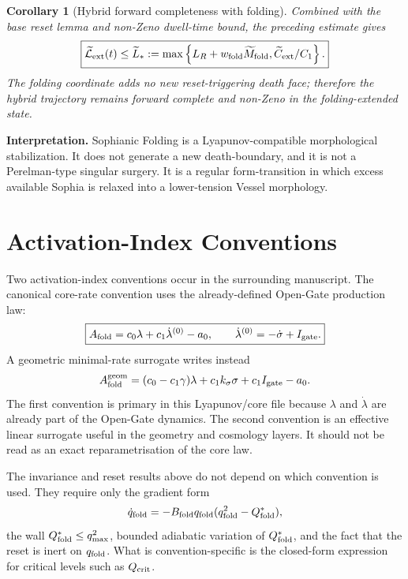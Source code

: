 \documentclass[11pt,a4paper]{article}
\theoremstyle{plain}
\newtheorem{corollary}{Corollary}
\theoremstyle{definition}
\theoremstyle{remark}
\begin{document}
\begin{corollary}[Hybrid forward completeness with folding]
Combined with the base reset lemma and non-Zeno dwell-time bound, the preceding
estimate gives
\begin{equation}
  \boxed{
  \widetilde{\mathcal L}_{\rm ext}(t)
  \le
  \widetilde L_*:=
  \max\left\{L_R+w_{\rm fold}\widetilde M_{\rm fold},
  \widetilde C_{\rm ext}/C_1\right\}.}
\end{equation}
The folding coordinate adds no new reset-triggering death face; therefore the
hybrid trajectory remains forward complete and non-Zeno in the folding-extended
state.
\end{corollary}

\textbf{Interpretation.} Sophianic Folding is a Lyapunov-compatible
morphological stabilization. It does not generate a new death-boundary, and it
is not a Perelman-type singular surgery. It is a regular form-transition in
which excess available Sophia is relaxed into a lower-tension Vessel morphology.



\section{Activation-Index Conventions}

Two activation-index conventions occur in the surrounding manuscript. The
canonical core-rate convention uses the already-defined Open-Gate production
law:
\begin{equation}
  \boxed{
  A_{\rm fold}=c_0\lambda+c_1\dot\lambda^{(0)}-a_0,
  \qquad
  \dot\lambda^{(0)}=-\dot\sigma+I_{\rm gate}.}
\end{equation}
A geometric minimal-rate surrogate writes instead
\begin{equation}
  A_{\rm fold}^{\rm geom}
  =(c_0-c_1\gamma)\lambda+c_1k_\sigma\sigma+c_1I_{\rm gate}-a_0.
\end{equation}
The first convention is primary in this Lyapunov/core file because $\lambda$ and
$\dot\lambda$ are already part of the Open-Gate dynamics. The second convention
is an effective linear surrogate useful in the geometry and cosmology layers.
It should not be read as an exact reparametrisation of the core law.

The invariance and reset results above do not depend on which convention is
used. They require only the gradient form
\begin{equation}
  \dot q_{\rm fold}
  =-B_{\rm fold}q_{\rm fold}
  (q_{\rm fold}^{2}-Q_{\rm fold}^{*}),
\end{equation}
the wall $Q_{\rm fold}^{*}\le q_{\max}^{2}$, bounded adiabatic variation of
$Q_{\rm fold}^{*}$, and the fact that the reset is inert on $q_{\rm fold}$. What
is convention-specific is the closed-form expression for critical levels such as
$Q_{\rm crit}$.
\end{document}
